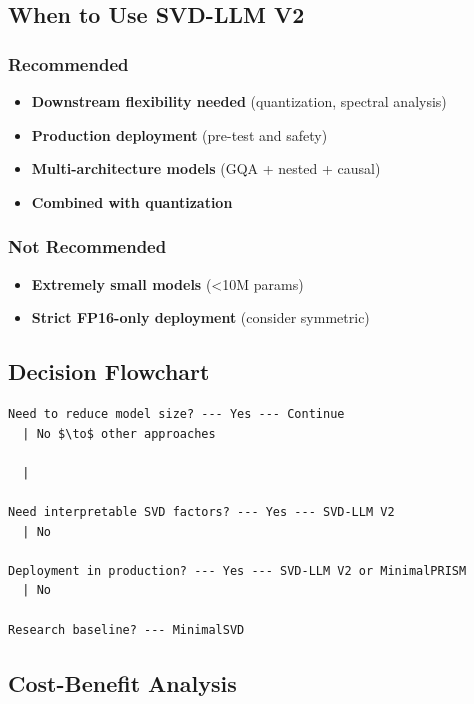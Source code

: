 \subsection{When to Use SVD-LLM V2}

\subsubsection{Recommended}

\begin{itemize}
\item \textbf{Downstream flexibility needed} (quantization, spectral analysis)
\item \textbf{Production deployment} (pre-test and safety)
\item \textbf{Multi-architecture models} (GQA + nested + causal)
\item \textbf{Combined with quantization}

\end{itemize}
\subsubsection{Not Recommended}

\begin{itemize}
\item \textbf{Extremely small models} (\textless{}10M params)
\item \textbf{Strict FP16-only deployment} (consider symmetric)

\end{itemize}
\subsection{Decision Flowchart}

\begin{lstlisting}
Need to reduce model size? --- Yes --- Continue
  | No $\to$ other approaches

  |
   
Need interpretable SVD factors? --- Yes --- SVD-LLM V2
  | No
   
Deployment in production? --- Yes --- SVD-LLM V2 or MinimalPRISM
  | No
   
Research baseline? --- MinimalSVD
\end{lstlisting}

\subsection{Cost-Benefit Analysis}

